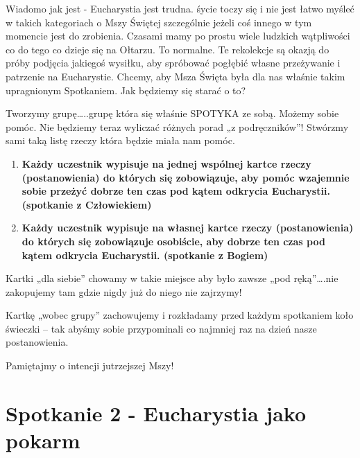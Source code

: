\documentclass[a5paper,10pt,polish]{book}
\begin{document}
Wiadomo jak jest - Eucharystia jest trudna. śycie toczy się i nie jest łatwo myśleć w takich kategoriach o Mszy Świętej szczególnie jeżeli coś innego w tym momencie jest do zrobienia. Czasami mamy po prostu wiele ludzkich wątpliwości co do tego co dzieje się na Ołtarzu. To normalne. Te rekolekcje są okazją do próby podjęcia jakiegoś wysiłku, aby spróbować pogłębić własne przeżywanie i patrzenie na Eucharystie. Chcemy, aby Msza Święta była dla nas właśnie takim upragnionym Spotkaniem. Jak będziemy się starać o to?

Tworzymy grupę…..grupę która się właśnie SPOTYKA ze sobą. Możemy sobie pomóc. Nie będziemy teraz wyliczać różnych porad „z podręczników”! Stwórzmy sami taką listę rzeczy która będzie miała nam pomóc.
\begin{enumerate}
\item {} 
\textbf{Każdy uczestnik wypisuje na jednej wspólnej kartce rzeczy (postanowienia) do których się zobowiązuje, aby pomóc wzajemnie sobie przeżyć dobrze ten czas pod kątem odkrycia Eucharystii. (spotkanie z Człowiekiem)}

\item {} 
\textbf{Każdy uczestnik wypisuje na własnej kartce rzeczy (postanowienia) do których się zobowiązuje osobiście, aby dobrze ten czas pod kątem odkrycia Eucharystii. (spotkanie z Bogiem)}

\end{enumerate}

Kartki „dla siebie” chowamy w takie miejsce aby było zawsze „pod ręką”….nie zakopujemy tam gdzie nigdy już do niego nie zajrzymy!

Kartkę „wobec grupy” zachowujemy i rozkładamy przed każdym spotkaniem koło świeczki – tak abyśmy sobie przypominali co najmniej raz na dzień nasze postanowienia.

Pamiętajmy o intencji jutrzejszej Mszy!


\chapter{Spotkanie 2 - Eucharystia jako pokarm}
\label{babice2006-jesien-knurow/spotkanie2:spotkanie-2-eucharystia-jako-pokarm}\label{babice2006-jesien-knurow/spotkanie2::doc}
\end{document}
